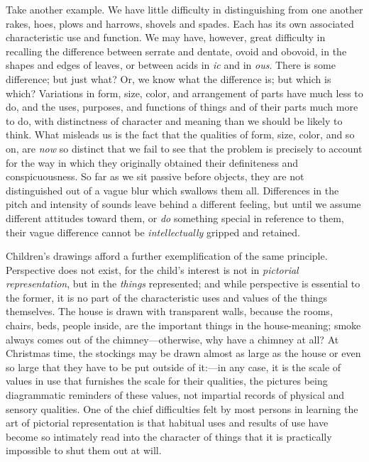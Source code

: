 \documentclass[letterpaper]{book}
\begin{document}

Take another example. We have little difficulty in distinguishing from
one another rakes, hoes, plows and harrows, shovels and spades. Each has
its own associated characteristic use and function. We may have,
however, great difficulty in recalling the difference between serrate
and dentate, ovoid and obovoid, in the shapes and edges of leaves, or
between acids in \emph{ic} and in \emph{ous}. There is some difference;
but just what? Or, we know what the difference is; but which is which?
Variations in form, size, color, and arrangement of parts have much less
to do, and the uses, purposes, and functions of things and of their
parts much more to do, with distinctness of character and meaning than
we should be likely to think. What misleads us is the fact that the
qualities of form, size, color, and so on, are \emph{now} so distinct
that we fail to see that the problem is precisely to account for the way
in which they originally obtained their definiteness and
conspicuousness. So far as we sit passive before objects, they are not
distinguished out of a vague blur which swallows them all. Differences
in the pitch and intensity of sounds leave behind a different feeling,
but until we assume different attitudes toward them, or \emph{do}
something special in reference to them, their vague difference cannot be
\emph{intellectually} gripped and retained.


Children's drawings afford a further exemplification of the same
principle. Perspective does not exist, for the child's interest is not
in \emph{pictorial representation}, but in the \emph{things}
represented; and while perspective is essential to the former, it is no
part of the characteristic uses and values of the things themselves. The
house
is drawn with transparent walls, because the rooms, chairs, beds, people
inside, are the important things in the house-meaning; smoke always
comes out of the chimney---otherwise, why have a chimney at all? At
Christmas time, the stockings may be drawn almost as large as the house
or even so large that they have to be put outside of it:---in any case,
it is the scale of values in use that furnishes the scale for their
qualities, the pictures being diagrammatic reminders of these values,
not impartial records of physical and sensory qualities. One of the
chief difficulties felt by most persons in learning the art of pictorial
representation is that habitual uses and results of use have become so
intimately read into the character of things that it is practically
impossible to shut them out at will.
\end{document}
